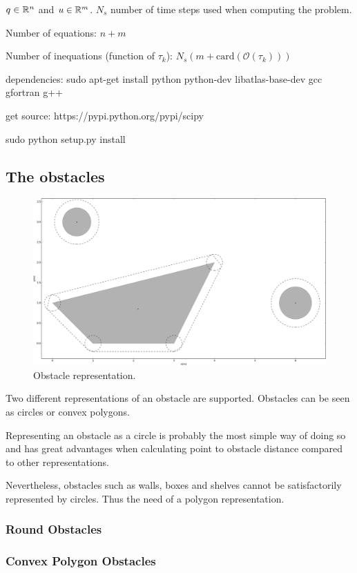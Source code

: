 $q \in \mathbb{R}^n$ and $u \in \mathbb{R}^m$. $N_s$ number of time steps used when computing the problem.

Number of equations: $n + m$

Number of inequations (function of $\tau_k$): $N_s(m+\mathrm{card}(\mathcal{O}(\tau_k)))$

dependencies:
sudo apt-get install python python-dev libatlas-base-dev gcc gfortran g++

get source:
https://pypi.python.org/pypi/scipy

sudo python setup.py install

\subsection{The obstacles}

\begin{figure}
	\centering
	\includegraphics[width=.7\textwidth]{./img/obstacles-no-title.png}
	\caption{Obstacle representation.\label{fig:obstacles}}
\end{figure}

Two different representations of an obstacle are supported. Obstacles can be seen as circles or convex polygons.

Representing an obstacle as a circle is probably the most simple way of doing so and has great advantages when calculating point to obstacle distance compared to other representations.

Nevertheless, obstacles such as walls, boxes and shelves cannot be satisfactorily represented by circles. Thus the need of a polygon representation.

\subsubsection{Round Obstacles}

\subsubsection{Convex Polygon Obstacles}

